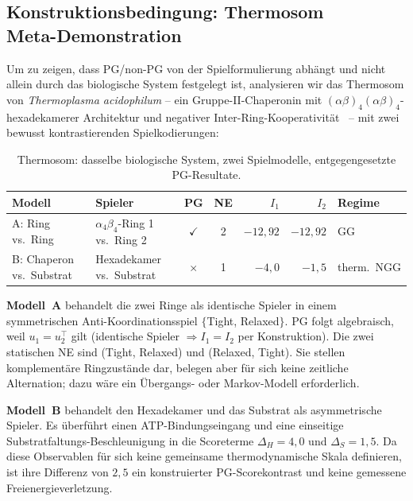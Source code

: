 \documentclass[12pt,a4paper]{article}
\begin{document}
\subsection[Konstruktionsbedingung: Thermosom]{Konstruktionsbedingung:
Thermosom\\ Meta-Demonstration}
\label{sec:thermosome}

Um zu zeigen, dass PG/non-PG von der Spielformulierung abhängt und nicht
allein durch das biologische System festgelegt ist, analysieren wir das Thermosom von
\emph{Thermoplasma acidophilum} -- ein Gruppe-II-Chaperonin mit
$(\alpha\beta)_4(\alpha\beta)_4$-hexadekamerer Architektur und negativer
Inter-Ring-Kooperativität~\cite{Bigotti2008,Gutsche2000} -- mit zwei bewusst
kontrastierenden Spielkodierungen:

\begin{table}[!htbp]
\centering
\caption{Thermosom: dasselbe biologische System, zwei Spielmodelle,
entgegengesetzte PG-Resultate.}
\label{tab:thermosome}
\footnotesize
\begin{tabularx}{\textwidth}{@{}L{0.22\textwidth}YccrrL{0.13\textwidth}@{}}
\toprule
Modell & Spieler & PG & NE & $I_1$ & $I_2$ & Regime \\
\midrule
A: Ring vs.\ Ring & $\alpha_4\beta_4$-Ring 1 vs.\ Ring 2 &
  $\checkmark$ & 2 & $-12{,}92$ & $-12{,}92$ & GG \\
B: Chaperon vs.\ Substrat & Hexadekamer vs.\ Substrat &
  $\times$ & 1 & $-4{,}0$ & $-1{,}5$ & therm.\ NGG \\
\bottomrule
\end{tabularx}
\end{table}

\textbf{Modell~A} behandelt die zwei Ringe als identische Spieler in
einem symmetrischen Anti-Koordinationsspiel $\{$Tight, Relaxed$\}$. PG
folgt algebraisch, weil $u_1 = u_2^\top$ gilt (identische Spieler
$\Rightarrow I_1 = I_2$ per Konstruktion). Die zwei statischen NE sind
(Tight, Relaxed) und (Relaxed, Tight). Sie stellen komplementäre
Ringzustände dar, belegen aber für sich keine zeitliche Alternation;
dazu wäre ein Übergangs- oder Markov-Modell erforderlich.

\textbf{Modell~B} behandelt den Hexadekamer und das Substrat als
asymmetrische Spieler. Es überführt einen ATP-Bindungseingang und eine
einseitige Substratfaltungs-Beschleunigung in die Scoreterme
$\Delta_H=4{,}0$ und $\Delta_S=1{,}5$. Da diese Observablen für sich keine
gemeinsame thermodynamische Skala definieren, ist ihre Differenz von
$2{,}5$ ein konstruierter PG-Scorekontrast und keine gemessene
Freienergieverletzung.
\end{document}
